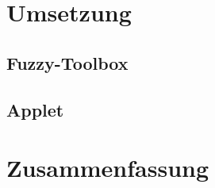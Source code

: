 \documentclass[10pt,a4paper]{article}
\begin{document}
\section{Umsetzung}

\subsection{Fuzzy-Toolbox}

\subsection{Applet}

\section{Zusammenfassung}
\end{document}
